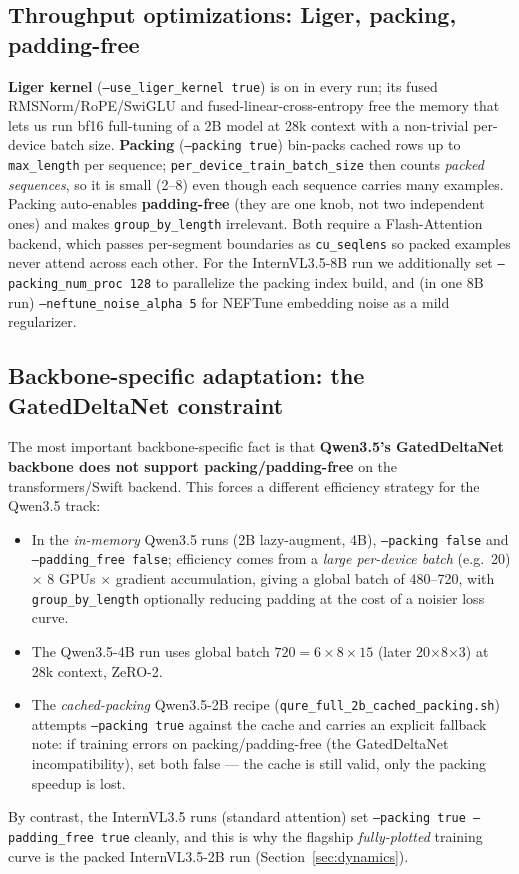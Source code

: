 \documentclass[11pt,a4paper]{article}
\begin{document}
\subsection{Throughput optimizations: Liger, packing, padding-free}
\label{sec:liger}
\textbf{Liger kernel} (\texttt{--use\_liger\_kernel true}) is on in every run; its fused RMSNorm/RoPE/SwiGLU and fused-linear-cross-entropy free the memory that lets us run bf16 full-tuning of a 2B model at 28k context with a non-trivial per-device batch size. \textbf{Packing} (\texttt{--packing true}) bin-packs cached rows up to \texttt{max\_length} per sequence; \texttt{per\_device\_train\_batch\_size} then counts \emph{packed sequences}, so it is small (2--8) even though each sequence carries many examples. Packing auto-enables \textbf{padding-free} (they are one knob, not two independent ones) and makes \texttt{group\_by\_length} irrelevant. Both require a Flash-Attention backend, which passes per-segment boundaries as \texttt{cu\_seqlens} so packed examples never attend across each other. For the InternVL3.5-8B run we additionally set \texttt{--packing\_num\_proc 128} to parallelize the packing index build, and (in one 8B run) \texttt{--neftune\_noise\_alpha 5} for NEFTune embedding noise as a mild regularizer.

\subsection{Backbone-specific adaptation: the GatedDeltaNet constraint}
\label{sec:sft-qwen}
The most important backbone-specific fact is that \textbf{Qwen3.5's GatedDeltaNet backbone does not support packing/padding-free} on the transformers/Swift backend. This forces a different efficiency strategy for the Qwen3.5 track:
\begin{itemize}[leftmargin=1.4em]
  \item In the \emph{in-memory} Qwen3.5 runs (2B lazy-augment, 4B), \texttt{--packing false} and \texttt{--padding\_free false}; efficiency comes from a \emph{large per-device batch} (e.g.\ 20) $\times$ 8 GPUs $\times$ gradient accumulation, giving a global batch of 480--720, with \texttt{group\_by\_length} optionally reducing padding at the cost of a noisier loss curve.
  \item The Qwen3.5-4B run uses global batch $720 = 6 \times 8 \times 15$ (later 20$\times$8$\times$3) at 28k context, ZeRO-2.
  \item The \emph{cached-packing} Qwen3.5-2B recipe (\texttt{qure\_full\_2b\_cached\_packing.sh}) attempts \texttt{--packing true} against the cache and carries an explicit fallback note: if training errors on packing/padding-free (the GatedDeltaNet incompatibility), set both false --- the cache is still valid, only the packing speedup is lost.
\end{itemize}
By contrast, the InternVL3.5 runs (standard attention) set \texttt{--packing true --padding\_free true} cleanly, and this is why the flagship \emph{fully-plotted} training curve is the packed InternVL3.5-2B run (Section~\ref{sec:dynamics}).
\end{document}
